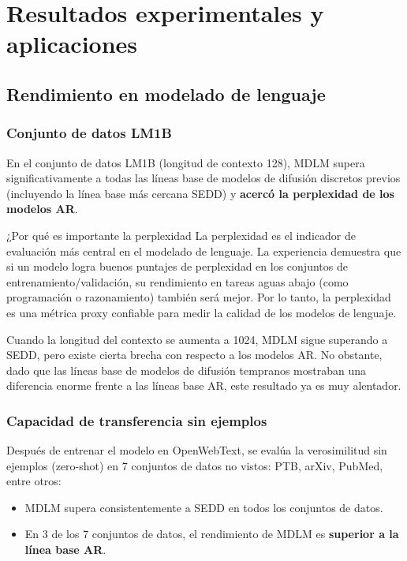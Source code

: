 \documentclass[a4paper]{article}
\begin{document}
\newpage
\section{Resultados experimentales y aplicaciones}

\subsection{Rendimiento en modelado de lenguaje}

\subsubsection{Conjunto de datos LM1B}

En el conjunto de datos LM1B (longitud de contexto 128), MDLM supera significativamente a todas las líneas base de modelos de difusión discretos previos (incluyendo la línea base más cercana SEDD) y \textbf{acercó la perplexidad de los modelos AR}.

\begin{knowledgebox}{¿Por qué es importante la perplexidad}
La perplexidad es el indicador de evaluación más central en el modelado de lenguaje. La experiencia demuestra que si un modelo logra buenos puntajes de perplexidad en los conjuntos de entrenamiento/validación, su rendimiento en tareas aguas abajo (como programación o razonamiento) también será mejor. Por lo tanto, la perplexidad es una métrica proxy confiable para medir la calidad de los modelos de lenguaje.
\end{knowledgebox}

Cuando la longitud del contexto se aumenta a 1024, MDLM sigue superando a SEDD, pero existe cierta brecha con respecto a los modelos AR. No obstante, dado que las líneas base de modelos de difusión tempranos mostraban una diferencia enorme frente a las líneas base AR, este resultado ya es muy alentador.

\subsubsection{Capacidad de transferencia sin ejemplos}

Después de entrenar el modelo en OpenWebText, se evalúa la verosimilitud sin ejemplos (zero-shot) en 7 conjuntos de datos no vistos: PTB, arXiv, PubMed, entre otros:
\begin{itemize}
    \item MDLM supera consistentemente a SEDD en todos los conjuntos de datos.
    \item En 3 de los 7 conjuntos de datos, el rendimiento de MDLM es \textbf{superior a la línea base AR}.
\end{itemize}
\end{document}
